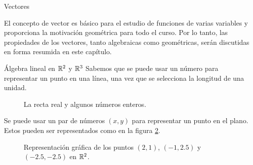 \begin{chapter}{Vectores}\label{chap-vectores}

    El concepto de vector es básico para el estudio de funciones de varias variables y proporciona la motivación geométrica para todo el curso. Por lo tanto, las propiedades de los vectores, tanto algebraicas como geométricas, serán discutidas en forma resumida en este capítulo.
    
    \begin{section}{\'Algebra lineal en $\mathbb R^2$ y $\mathbb R^3$}\label{seccion-algebra-lineal-en-R2-yR3}  
        Sabemos que se puede usar un número para representar un punto en una línea, una vez que se selecciona la longitud de una unidad.
        
        \begin{figure}[h]\label{fig-punto-en-R}
            \caption{La recta real y algunos números enteros.}
        \end{figure}
        
        Se puede usar un par de números $(x, y)$ para representar un punto en el plano. Estos pueden ser representados como en la figura \ref{fig-punto-en-R2}.
        \begin{figure}[h]
        	\centering
            \caption{Representación gráfica de los puntos $(2,1)$, $(-1,2.5)$ y  $(-2.5,-2.5)$ en $\mathbb R^2$.}
            \label{fig-punto-en-R2}
        \end{figure}


\end{section}
\end{chapter}
